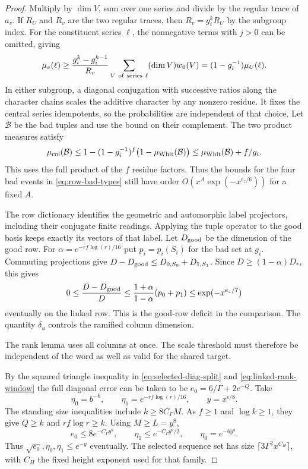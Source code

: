 \begin{proof}
Multiply by \(\dim V\), sum over one series and
divide by the regular trace of \(a_v\). If \(R_U\) and \(R_v\) are the two regular traces, then
\(R_v=g_i^kR_U\) by the subgroup index. For the constituent
series \(\ell\), the nonnegative terms with \(j>0\) can be
omitted, giving
\[
 \mu_v(\ell)\ge \frac{g_i^k-g_i^{k-1}}{R_v}
            \sum_{V\ {\rm of\ series}\ \ell}(\dim V)w_0(V)
      =(1-g_i^{-1})\mu_U(\ell).
\]
In either subgroup, a diagonal conjugation with
successive ratios along the character chains scales the additive
character by any nonzero residue. It fixes the central series
idempotents, so the probabilities are independent of that choice.
Let \(\mathcal B\) be the bad tuples and use the bound on
their complement. The two product measures satisfy
\[
 \mu_{\rm col}(\mathcal B)
 \le1-(1-g_i^{-1})^f\big(1-\mu_{\rm Whit}(\mathcal B)\big)
 \le \mu_{\rm Whit}(\mathcal B)+f/g_i .
\]
This uses the full product of the \(f\) residue factors.
Thus the bounds for the four bad events in
\eqref{eq:row-bad-types} still have order
\(O(x^A\exp(-x^{e_z/6}))\) for a fixed \(A\).
\label{cor:selected-row-gram-8}


The row dictionary identifies the geometric and automorphic
label projectors, including their conjugate finite readings.
Applying the tuple operator to the good basis keeps exactly its
vectors of that label. Let \(D_{\rm good}\) be the dimension of
the good row. For \(\alpha=e^{-rf\log(r)/16}\) put
\(p_i=p_i(S_i)\) for the bad set at \(g_i\). Commuting projections
give \(D-D_{\rm good}\le D_{0,S_0}+D_{1,S_1}\).
Since \(D\ge(1-\alpha)D_*\), this gives
\[
  0\le\frac{D-D_{\rm good}}{D}
       \le \frac{1+\alpha}{1-\alpha}(p_0+p_1)
       \le\exp(-x^{e_z/7})
\]
eventually on the linked row. This is the good-row deficit in the
comparison. The quantity \(\delta_u\) controls the ramified
column dimension.


The rank lemma uses all columns at once. The scale threshold must therefore be independent of the word as well as valid for the shared target.


By the squared triangle inequality in \eqref{eq:selected-diag-split}
and \eqref{eq:linked-rank-window} the full diagonal error can be
taken to be \(e_0=6/\Gamma+2e^{-Q}\). Take
\[
 \eta_0=b^{-6},\qquad \eta_1=e^{-rf\log(r)/16},
 \qquad y=x^{\epsilon/8}.
\]
The standing size inequalities include \(k\ge8 C_\Gamma M\).
As \(f\ge1\) and \(\log k\ge1\), they give \(Q\ge k\) and
\(rf\log r\ge k\). Using \(M\ge L=y^8\),
\[
 e_0\le 8e^{-C_\Gamma y^8},\qquad
 \eta_1\le e^{-C_\Gamma y^8/2},\qquad
 \eta_0=e^{-6y^8}.
\]
Thus \(\sqrt{e_0},\eta_0,\eta_1\le e^{-y}\) eventually.
The selected sequence set has size
\(\lceil 3\Gamma^2 x^{C_H}\rceil\), with \(C_H\) the fixed
height exponent used for that family.


\end{proof}
